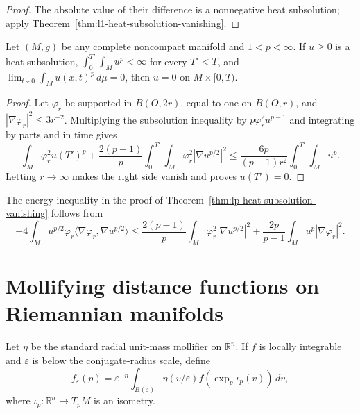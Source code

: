 \begin{proof}
The absolute value of their difference is a nonnegative heat subsolution;
apply Theorem~\ref{thm:l1-heat-subsolution-vanishing}.
\end{proof}

\begin{theorem}
\label{thm:lp-heat-subsolution-vanishing}
Let $(M,g)$ be any complete noncompact manifold and $1<p<\infty$.  If
$u\geq0$ is a heat subsolution,
$\int_0^{T'}\int_Mu^p<\infty$ for every $T'<T$, and
$\lim_{t\downarrow0}\int_Mu(x,t)^p\,d\mu=0$, then
$u=0$ on $M\times[0,T)$.
\end{theorem}

\begin{proof}
Let $\varphi_r$ be supported in $B(O,2r)$, equal to one on $B(O,r)$, and
$|\nabla\varphi_r|^2\leq3r^{-2}$.  Multiplying the subsolution inequality by
$p\varphi_r^2u^{p-1}$ and integrating by parts and in time gives
\[
\int_M\varphi_r^2u(T')^p+
\frac{2(p-1)}p\int_0^{T'}\!\int_M
\varphi_r^2|\nabla u^{p/2}|^2
\leq\frac{6p}{(p-1)r^2}\int_0^{T'}\!\int_Mu^p.
\]
Letting $r\to\infty$ makes the right side vanish and proves $u(T')=0$.
\end{proof}

\begin{example}
\label{ex:derive-lp-heat-energy-inequality}
The energy inequality in the proof of
Theorem~\ref{thm:lp-heat-subsolution-vanishing} follows from
\[
-4\int_Mu^{p/2}\varphi_r\langle\nabla\varphi_r,
\nabla u^{p/2}\rangle
\leq\frac{2(p-1)}p\int_M\varphi_r^2|\nabla u^{p/2}|^2
+\frac{2p}{p-1}\int_Mu^p|\nabla\varphi_r|^2.
\]
\end{example}

\section{Mollifying distance functions on Riemannian manifolds}

Let $\eta$ be the standard radial unit-mass mollifier on $\mathbb R^n$.  If
$f$ is locally integrable and $\varepsilon$ is below the conjugate-radius
scale, define
\[
f_\varepsilon(p)=\varepsilon^{-n}\int_{B(\varepsilon)}
\eta(v/\varepsilon)f(\exp_p\iota_p(v))\,dv,
\]
where $\iota_p:\mathbb R^n\to T_pM$ is an isometry.

